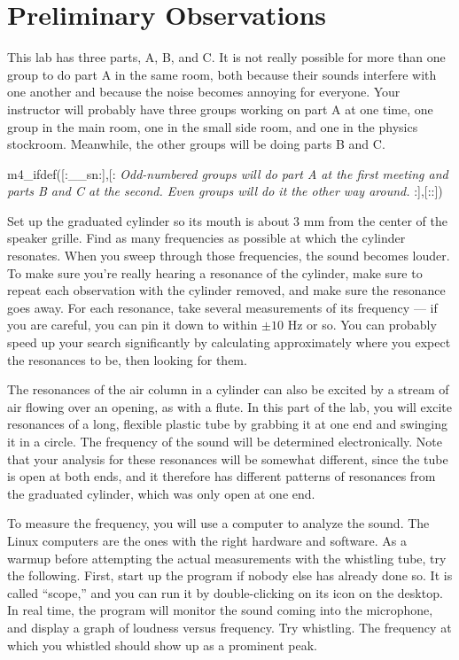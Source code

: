 \section{Preliminary Observations}

\observations

This lab has three parts, A, B, and C.  It is not really
possible for more than one group to do part A in the same
room, both because their sounds interfere with one another
and because the noise becomes annoying for everyone.  Your
instructor will probably have three groups working on part A
at one time, one group in the main room, one in the small
side room, and one in the physics stockroom.  Meanwhile, the
other groups will be doing parts B and C.

m4_ifdef([:__sn:],[:%
\emph{Odd-numbered groups will do part A at the first meeting and parts B and C at the second.
Even groups will do it the other way around.}
:],[::])


Set up the graduated cylinder so its mouth is about 3 mm from the center of the speaker grille.
Find as many frequencies as possible
at which the cylinder resonates.  When you sweep through those frequencies, the
sound becomes louder.  To make sure you're really hearing
a resonance of the cylinder, make sure to repeat each
observation with the cylinder removed, and make sure the
resonance goes away.
  For each resonance, take
several measurements of its frequency --- if you are
careful, you can pin it down to within $\pm 10$ Hz or so.  You
can probably speed up your search significantly by
calculating approximately where you expect the resonances to
be, then looking for them.


The resonances of the air column in a cylinder can also be
excited by a stream of air flowing over an opening, as with
a flute.  In this part of the lab, you will excite
resonances of a long, flexible plastic tube by grabbing it
at one end and swinging it in a circle.  The frequency of
the sound will be determined electronically. Note that your
analysis for these resonances will be somewhat different,
since the tube is open at both ends, and it therefore has
different patterns of resonances from the graduated
cylinder, which was only open at one end.

To measure the frequency, you will use a computer to analyze
the sound. The Linux computers are the ones with the right hardware and software.
As a warmup before attempting the actual
measurements with the whistling tube, try the following. 
First, start up the program if nobody else has already done
so.  It is called ``scope,'' and you can run it by double-clicking
on its icon on the desktop. 
In real time, the program will monitor the sound coming into the
microphone, and display a graph of loudness versus frequency.
Try whistling. The frequency at which you whistled should show
up as a prominent peak. 

